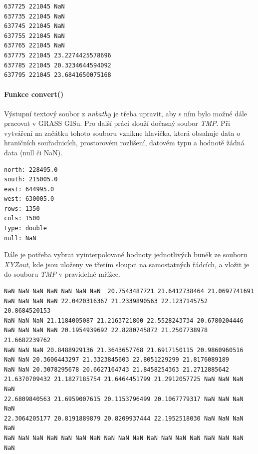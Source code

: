 \documentclass[12pt,a4paper]{article}
\begin{document}
{\bigskip
\lstset{basicstyle=\footnotesize}
\begin{lstlisting}[caption={XYZout}]
637725 221045 NaN
637735 221045 NaN
637745 221045 NaN
637755 221045 NaN
637765 221045 NaN
637775 221045 23.2274425578696
637785 221045 20.3234644594092
637795 221045 23.6841650075168
\end{lstlisting}

\bigskip
\paragraph{Funkce convert()}

Výstupní textový soubor z \emph{nnbathy} je třeba upravit, aby s ním
bylo možné dále pracovat v GRASS GISu. Pro další práci slouží dočasný
soubor \emph{TMP}. Při vytváření na začátku tohoto souboru vznikne
hlavička, která obsahuje data o hraničních souřadnicích, prostorovém
rozlišení, datovém typu a hodnotě žádná data (null či NaN).

\newpage
\lstset{basicstyle=\ttfamily}
\begin{lstlisting}[caption={Hlavička souboru TMP}]
north: 228495.0
south: 215005.0
east: 644995.0
west: 630005.0
rows: 1350
cols: 1500
type: double
null: NaN
\end{lstlisting}

Dále je potřeba vybrat vyinterpolované hodnoty jednotlivých buněk ze
souboru \emph{XYZout}, kde jsou uloženy ve třetím sloupci na
samostatných řádcích, a vložit je do souboru \emph{TMP} v pravidelné
mřížce.

\lstset{basicstyle=\footnotesize}
\begin{lstlisting}
NaN NaN NaN NaN NaN NaN NaN  20.7543487721 21.6412738464 21.0697741691 
NaN NaN NaN NaN 22.0420316367 21.2339890563 22.1237145752 20.8684520153 
NaN NaN NaN 21.1184005087 21.2163721800 22.5528243734 20.6780204446 
NaN NaN NaN NaN 20.1954939692 22.8280745872 21.2507738978 21.6682239762 
NaN NaN NaN 20.8488929136 21.3643657768 21.6917150115 20.9860960516 
NaN NaN 20.3606443297 21.3323845603 22.8051229299 21.8176089189 
NaN NaN 20.3078295678 20.6627164743 21.8458254363 21.2712885642 
21.6370709432 21.1827185754 21.6464451799 21.2912057725 NaN NaN NaN NaN 
22.6809840563 21.6959007615 20.1153796499 20.1067779317 NaN NaN NaN NaN 
22.3064205177 20.8191889879 20.8209937444 22.1952518030 NaN NaN NaN NaN 
NaN NaN NaN NaN NaN NaN NaN NaN NaN NaN NaN NaN NaN NaN NaN NaN NaN NaN 

\end{lstlisting}

}
\end{document}
